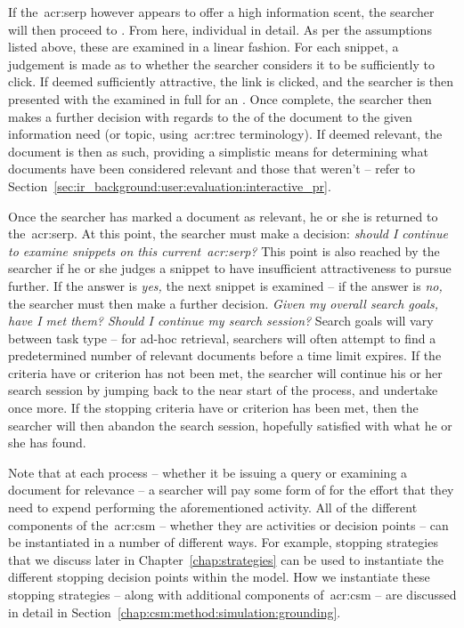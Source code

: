 If the~\gls{acr:serp} however appears to offer a high information scent, the searcher will then proceed to . From here, individual  in detail. As per the assumptions listed above, these are examined in a linear fashion. For each snippet, a judgement is made as to whether the searcher considers it to be sufficiently  to click. If deemed sufficiently attractive, the link is clicked, and the searcher is then presented with the  examined in full for an . Once complete, the searcher then makes a further decision with regards to the  of the document to the given information need (or topic, using~\gls{acr:trec} terminology). If deemed relevant, the document is then  as such, providing a simplistic means for determining what documents have been considered relevant and those that weren't -- refer to Section~\ref{sec:ir_background:user:evaluation:interactive_pr}.

Once the searcher has marked a document as relevant, he or she is returned to the~\gls{acr:serp}. At this point, the searcher must make a decision: \emph{should I continue to examine snippets on this current~\gls{acr:serp}?} This point is also reached by the searcher if he or she judges a snippet to have insufficient attractiveness to pursue further. If the answer is \emph{yes,} the next snippet is examined -- if the answer is \emph{no,} the searcher must then make a further decision. \emph{Given my overall search goals, have I met them? Should I continue my search session?} Search goals will vary between task type -- for ad-hoc retrieval, searchers will often attempt to find a predetermined number of relevant documents before a time limit expires. If the criteria have or criterion has not been met, the searcher will continue his or her search session by jumping back to the near start of the process, and undertake  once more. If the stopping criteria have or criterion has been met, then the searcher will then abandon the search session, hopefully satisfied with what he or she has found.

Note that at each process -- whether it be issuing a query or examining a document for relevance -- a searcher will pay some form of  for the effort that they need to expend performing the aforementioned activity. All of the different components of the~\gls{acr:csm} -- whether they are activities or decision points -- can be instantiated in a number of different ways. For example, stopping strategies that we discuss later in Chapter~\ref{chap:strategies} can be used to instantiate the different stopping decision points within the model. How we instantiate these stopping strategies -- along with additional components of~\gls{acr:csm} -- are discussed in detail in Section~\ref{chap:csm:method:simulation:grounding}.

